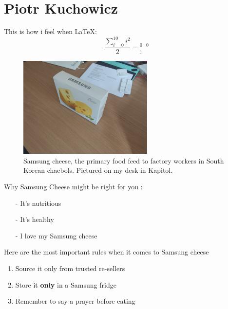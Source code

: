 \newpage
\section{Piotr Kuchowicz}

This is how i feel when \LaTeX :
\[\frac{\sum^{10}_{i=0}i^2}2=\text{}^{0\,\,\,\,\,0}_{\underbrace{\text{,}}}\]

\begin{figure}[htbp] 
    \centering
    \includegraphics[width=0.6\textwidth]{pictures/samsung_cheese.jpg}
    \caption{Samsung cheese, the primary food feed to factory workers in South Korean chaebols. Pictured on my desk in Kapitol.}
    \label{fig:samcheese}
\end{figure}



Why Samsung Cheese might be right for you :
\begin{itemize}
  \item[-] It's nutritious
  \item[-] It's healthy
  \item[-] I love my Samsung cheese
\end{itemize}

Here are the most important rules when it comes to Samsung cheese
\begin{enumerate}
  \item Source it only from trusted re-sellers
  \item Store it \textbf{only} in a Samsung fridge
  \item Remember to say a prayer before eating
\end{enumerate}

